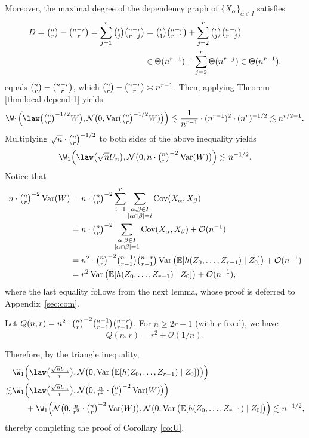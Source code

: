 \documentclass[mnsc,nonblindrev]{informs3}
\begin{document}
Moreover, the maximal degree of the dependency graph of $\{X_\alpha\}_{\alpha\in I}$ satisfies 
\begin{align*}
D = \tbinom{n}{r}-\tbinom{n-r}{r}=\sum_{j=1}^r\tbinom{r}{j}\tbinom{n-r}{r-j} &= \tbinom{r}{1}\tbinom{n-r}{r-1} + \sum_{j=2}^r\tbinom{r}{j}\tbinom{n-r}{r-j}\\
&\in \Theta(n^{r-1}) + \sum_{j=2}^r\Theta(n^{r-j}) \in \Theta(n^{r-1}).
\end{align*}equals
$\tbinom{n}{r}-\tbinom{n-r}{r}$, which 
$\tbinom{n}{r}-\tbinom{n-r}{r}\asymp n^{r-1}$. Then, applying Theorem \ref{thm:local-depend-1} yields
\begin{align*}
\W_1\Big(\law\big(\tbinom{n}{r}^{-1/2} W\big), \mathcal N\big(0, \operatorname{Var}(\tbinom{n}{r}^{-1/2} W)\big)\Big) \lesssim \frac{1}{n^{r-1}} \cdot (n^{r-1})^2 \cdot (n^r)^{-1/2} \lesssim n^{r/2-1}.
\end{align*}
Multiplying $\sqrt{n}\cdot\tbinom{n}{r}^{-1/2}$ to both sides of the above inequality yields
\begin{align*}
\W_1\Big(\law\big(\sqrt{n}U_n\big), \mathcal N\big(0, n\cdot\tbinom{n}{r}^{-2}\operatorname{Var}(W)\big)\Big) \lesssim  n^{-1/2}.
\end{align*}
Notice that
\begin{align*}
n\cdot\tbinom{n}{r}^{-2}\operatorname{Var}(W) &= n\cdot\tbinom{n}{r}^{-2} \sum_{i=1}^r\sum_{\substack{\alpha,\beta\in I\\ |\alpha\cap\beta|=i}}\operatorname{Cov}(X_\alpha, X_\beta)\\
&= n\cdot\tbinom{n}{r}^{-2} \sum_{\substack{\alpha,\beta\in I\\ |\alpha\cap\beta|=1}}\operatorname{Cov}(X_\alpha, X_\beta) + \mathcal{O}(n^{-1})\\
&= n^2\cdot\tbinom{n}{r}^{-2}\tbinom{n-1}{r-1}\tbinom{n-r}{r-1}\operatorname{Var}\big(\mathbb{E}[h(Z_0,\ldots,Z_{r-1}) \mid Z_0]\big) + \mathcal{O}(n^{-1})\\
&= r^2\operatorname{Var}\big(\mathbb{E}[h(Z_0,\ldots,Z_{r-1}) \mid Z_0]\big) + \mathcal{O}(n^{-1}),
\end{align*}
where the last equality follows from the next lemma, whose proof is deferred to Appendix~\ref{sec:com}. 
\begin{lemma}\label{lem:com}
Let $Q(n,r)=n^2\cdot \tbinom{n}{r}^{-2}\tbinom{n-1}{r-1}\tbinom{n-r}{r-1}.$
For $n\ge 2r-1$ (with $r$ fixed), we have
\[
Q(n,r)=r^{2}+\mathcal{O} (1/n). 
\]
\end{lemma}
Therefore, by the triangle inequality,
\begin{align*}
&\W_1\Big(\law\big(\tfrac{\sqrt{n}U_n}{r}\big), \mathcal N\big(0, \operatorname{Var}\big(\mathbb{E}[h(Z_0,\ldots,Z_{r-1}) \mid Z_0]\big)\big)\Big) \\
\lesssim& \W_1\Big(\law\big(\tfrac{\sqrt{n}U_n}{r}\big), \mathcal N\big(0, \tfrac{n}{r^2}\cdot\tbinom{n}{r}^{-2}\operatorname{Var}(W)\big)\Big)\\
&~~~~~+\W_1\Big(\mathcal N\big(0, \tfrac{n}{r^2}\cdot\tbinom{n}{r}^{-2}\operatorname{Var}(W)\big), \mathcal N\big(0, \operatorname{Var}\big(\mathbb{E}[h(Z_0,\ldots,Z_{r-1}) \mid Z_0]\big)\Big)\lesssim n^{-1/2},
\end{align*}
thereby completing the proof of Corollary \ref{co:U}.
\end{document}
